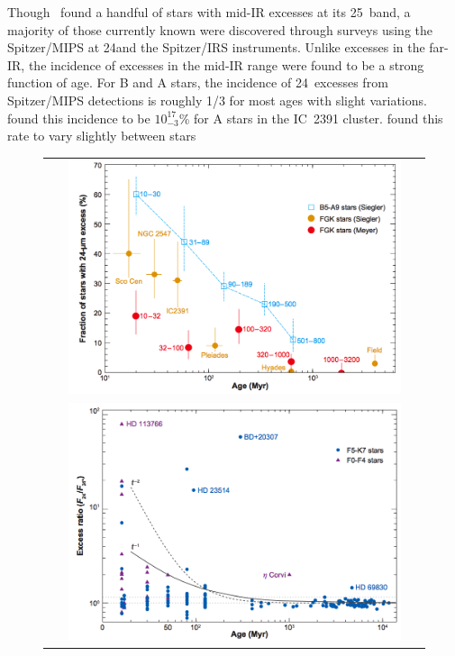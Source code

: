    Though \iras\ found a handful of stars with mid-IR excesses at its 25\micron\ band, a majority of those currently known were discovered through surveys using the Spitzer/MIPS at 24\micron and the Spitzer/IRS instruments. Unlike excesses in the far-IR, the incidence of excesses in the mid-IR range were found to be a strong function of age. For B and A stars, the incidence of 24\micron\ excesses from Spitzer/MIPS detections is roughly 1/3 for most ages \citep{Wyatt2008} with slight variations. \citet{Siegler2007} found this incidence to be $10^{17}_{-3}$\% for A stars in the IC~2391 cluster. \citet{Chen2012} found this rate to vary slightly between stars    %
    \begin{figure}
    \centering
    \begin{tabular}{c}
    \includegraphics[width=0.9\textwidth]{Ch1/frac24_wyatt2008_siegler2007} \\
    \includegraphics[width=0.9\textwidth]{Ch1/R24_wyatt2008_siegler2007}
    \end{tabular}
    \caption[]{}
    \label{fig:24micron_evolution}
    \end{figure}
